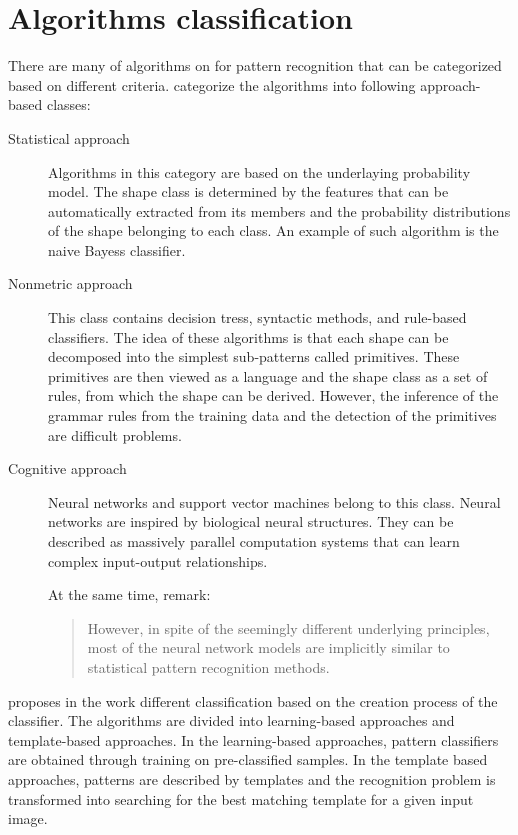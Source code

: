 \section{Algorithms classification}
There are many of algorithms on for pattern recognition that can be categorized based on different criteria. \citet{imageRecognition} categorize the algorithms into following approach-based classes:
\begin{description}
\item [Statistical approach] Algorithms in this category are based on the underlaying probability model. The shape class is determined by the features that can be automatically extracted from its members and the probability distributions of the shape belonging to each class. An example of such algorithm is the naive Bayess classifier.

\item [Nonmetric approach] This class contains decision tress, syntactic methods, and rule-based classifiers. The idea of these algorithms is that each shape can be decomposed into the simplest sub-patterns called primitives. These primitives are then viewed as a language and the shape class as a set of rules, from which the shape can be derived. However, the inference of the grammar rules from the training data and the detection of the primitives are difficult problems.

\item [Cognitive approach] Neural networks and support vector machines belong to this class. Neural networks are inspired by biological neural structures. They can be described as massively parallel computation systems that can learn complex input-output relationships.

At the same time, \cite{imageRecognition} remark:
\begin{quotation} However, in spite of the seemingly different underlying principles, most of the neural network models are implicitly similar to statistical pattern recognition methods. \end{quotation}

\end{description}

\cite{skeletonMatching} proposes in the work different classification based on the creation process of the classifier. The algorithms are divided into learning-based approaches and template-based approaches. In the learning-based approaches, pattern classifiers are obtained through training on pre-classified samples. In the template based approaches, patterns are described by templates and the recognition problem is transformed into searching for the best matching template for a given input image.

